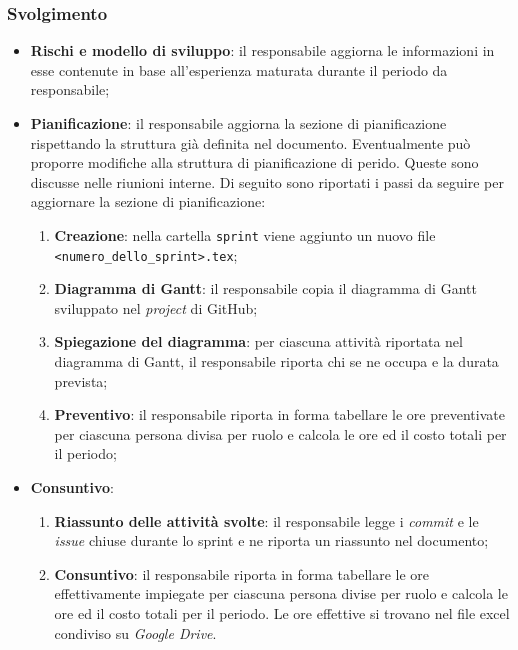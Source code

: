 \subsubsection{Svolgimento}
\begin{itemize}
	\item \textbf{Rischi e modello di sviluppo}: il responsabile aggiorna
	      le informazioni in esse contenute in base all'esperienza maturata
	      durante il periodo da responsabile;

	\item \textbf{Pianificazione}: il responsabile aggiorna la sezione di
	      pianificazione rispettando la struttura già definita nel documento.
	      Eventualmente può proporre modifiche alla struttura di pianificazione
	      di perido. Queste sono discusse nelle riunioni interne.
	      Di seguito sono riportati i passi da seguire per aggiornare la sezione
	      di pianificazione:
	      \begin{enumerate}
		      \item \textbf{Creazione}: nella cartella \texttt{sprint} viene
		            aggiunto un nuovo file \texttt{<numero\_dello\_sprint>.tex};

		      \item \textbf{Diagramma di Gantt}: il responsabile copia il
		            diagramma di Gantt sviluppato nel \textit{project} di
		            GitHub\g;

		      \item \textbf{Spiegazione del diagramma}: per ciascuna attività
		            riportata nel diagramma di Gantt, il responsabile riporta
		            chi se ne occupa e la durata prevista;

		      \item \textbf{Preventivo}: il responsabile riporta in forma
		            tabellare le ore preventivate per ciascuna persona divisa
		            per ruolo e calcola le ore ed il costo totali per il
		            periodo;
	      \end{enumerate}

	\item \textbf{Consuntivo}:
	      \begin{enumerate}
		      \item \textbf{Riassunto delle attività svolte}: il responsabile
		            legge i \textit{commit} e le \textit{issue\g} chiuse durante
		            lo sprint e ne riporta un riassunto nel documento;

		      \item \textbf{Consuntivo}: il responsabile riporta in forma
		            tabellare le ore effettivamente impiegate per ciascuna
		            persona divise per ruolo e calcola le ore ed il costo
		            totali per il periodo. Le ore effettive si trovano nel file
		            excel condiviso su \textit{Google Drive}.


\end{enumerate}
\end{itemize}
